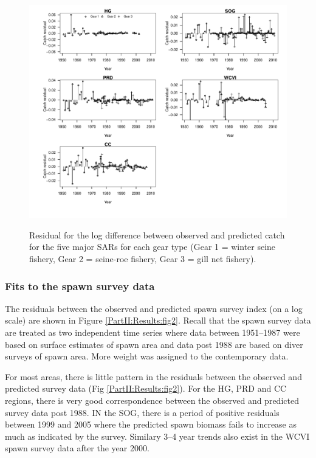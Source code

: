 \begin{figure}[!tbp]
	\includegraphics[width=\textwidth]{../FIGS/qPriorFigs/iscam_fig_catchresid.pdf}\\
	\caption{Residual for the log difference between observed and predicted catch for the five major SARs for each gear type (Gear 1 = winter seine fishery, Gear 2 = seine-roe fishery, Gear 3 = gill net fishery).}\label{PartII:Results:fig1}
\end{figure}


\subsubsection{Fits to the spawn survey data}
The residuals between the observed and predicted spawn survey index (on a log scale) are shown in Figure \ref{PartII:Results:fig2}.  Recall that the spawn survey data are treated as two independent time series where data between 1951--1987 were based on surface estimates of spawn area and data post 1988 are based on diver surveys of spawn area.  More weight was assigned to the contemporary data.   

For most areas, there is little pattern in the residuals between the observed and predicted survey data (Fig \ref{PartII:Results:fig2}).  For the HG, PRD and CC regions, there is very good correspondence between the observed and predicted survey data post 1988.  IN the SOG, there is a period of positive residuals between 1999 and 2005 where the predicted spawn biomass fails to increase as much as indicated by the survey.  Similary 3--4 year trends also exist in the WCVI spawn survey data after the year 2000.

